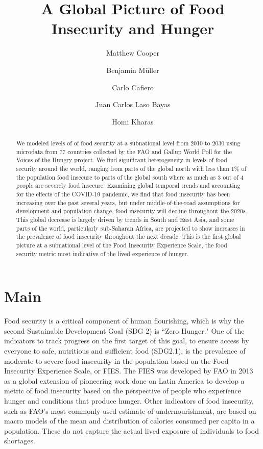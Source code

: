 \documentclass{article}
\begin{document}
\title{A Global Picture of Food Insecurity and Hunger}

\author[1,2,*]{Matthew Cooper}
\author[2,3]{Benjamin Müller}
\author[4]{Carlo Cafiero}
\author[2,5]{Juan Carlos Laso Bayas}
\author[2,6]{Homi Kharas}


\maketitle
\begin{abstract}
We modeled levels of of food security at a subnational level from 2010 to 2030 using microdata from 77 countries collected by the FAO and Gallup World Poll for the Voices of the Hungry project.  We find significant heterogeneity in levels of food security around the world, ranging from parts of the global north with less than 1\% of the population food insecure to parts of the global south where as much as 3 out of 4 people are severely food insecure.  Examining global temporal trends and accounting for the effects of the COVID-19 pandemic, we find that food insecurity has been increasing over the past several years, but under middle-of-the-road assumptions for development and population change, food insecurity will decline throughout the 2020s.  This global decrease is largely driven by trends in South and East Asia, and some parts of the world, particularly sub-Saharan Africa, are projected to show increases in the prevalence of food insecurity throughout the next decade. This is the first global picture at a subnational level of the Food Insecurity Experience Scale, the food security metric most indicative of the lived experience of hunger.
\end{abstract}

\section{Main}
Food security is a critical component of human flourishing, which is why the second Sustainable Development Goal (SDG 2) is “Zero Hunger." One of the indicators to track progress on the first target of this goal, to ensure access by everyone to safe, nutritious and sufficient food (SDG2.1), is the prevalence of moderate to severe food insecurity in the population based on the Food Insecurity Experience Scale, or FIES. The FIES was developed by FAO in 2013 as a global extension of pioneering work done on Latin America to develop a metric of food insecurity based on the perspective of people who experience hunger and conditions that produce hunger. Other indicators of food insecurity, such as FAO's most commonly used estimate of undernourishment, are based on macro models of the mean and distribution of calories consumed per capita in a population. These do not capture the actual lived exposure of individuals to food shortages. 
\end{document}
